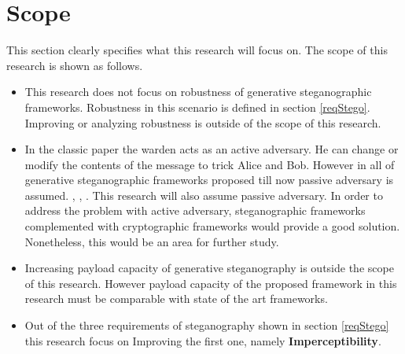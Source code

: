 \documentclass[../main/main.tex]{subfiles}
\begin{document}
	
	\section{Scope}
	This section clearly specifies what this research will focus on. The scope of this research is shown as follows.
	
	\begin{itemize}
		\item This research does not focus on robustness of generative steganographic frameworks. Robustness in this scenario is defined in section \ref{reqStego}. Improving or analyzing robustness is outside of the scope of this research.
		
		\item In the classic paper  the warden acts as an active adversary. He can change or modify the contents of the message to trick Alice and Bob. However in all of generative steganographic frameworks proposed till now passive adversary is assumed. , , . This research will also assume passive adversary. In order to address the problem with active adversary, steganographic frameworks complemented with  cryptographic frameworks would provide a good solution. Nonetheless, this would be an area for further study.
		
		\item Increasing payload capacity of generative steganography is outside the scope of this research. However payload capacity of the proposed framework in this research must be comparable with state of the art frameworks. 
		
		\item Out of the three requirements of steganography shown in section \ref{reqStego} this research focus on Improving the first one, namely \textbf{Imperceptibility}.
	\end{itemize}
\end{document}
